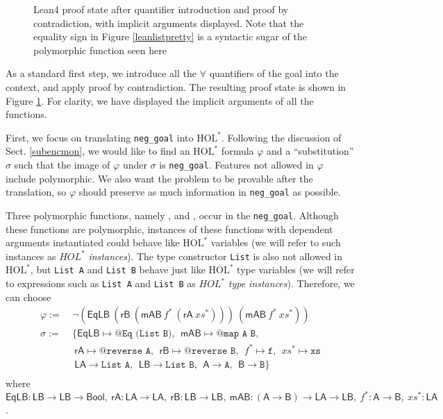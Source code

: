 \begin{figure}
  \begin{CenteredBox}
    
  \end{CenteredBox}
  \caption{Lean4 proof state after quantifier introduction and proof by contradiction, with implicit arguments displayed.
    Note that the equality sign in Figure \ref{leanlistpretty} is a syntactic sugar of
    the polymorphic function {\usebox{\vEq}} seen here}
  \label{leanlistexplicit}
\end{figure}

As a standard first step, we introduce all the $\forall$ quantifiers
of the goal into the context, and apply proof by contradiction. The resulting proof state
is shown in Figure \ref{leanlistexplicit}.
For clarity, we have displayed the implicit arguments of all the functions.

First, we focus on translating \texttt{neg\_goal} into $\text{HOL}^*$. Following the
discussion of Sect. \ref{subencmon}, we would like to find an $\text{HOL}^*$ formula $\varphi$
and a ``substitution'' $\sigma$ such that the image of $\varphi$ under $\sigma$ is \texttt{neg\_goal}.
Features not allowed in $\varphi$ include polymorphic. We also want the problem to
be provable after the translation, so $\varphi$ should preserve as much information in
\texttt{neg\_goal} as possible.

Three polymorphic functions, namely \usebox{\vEq}, \usebox{\vmap} and \usebox{\vrev}, occur in the \texttt{neg\_goal}.
Although these functions are polymorphic, instances of these functions
with dependent arguments instantiated could behave like $\text{HOL}^*$ variables
(we will refer to such instances as $\mathit{HOL}^*$ \textit{instances}).
The type constructor \texttt{List} is also not allowed in $\text{HOL}^*$, but
\texttt{List A} and \texttt{List B} behave just like $\text{HOL}^*$ type variables
(we will refer to expressions such as \texttt{List A} and \texttt{List B} as $\mathit{HOL}^*$ \textit{type instances}).
Therefore, we can choose
$$\begin{aligned}
  \varphi := & \ \neg (\mathsf{EqLB} \ (\mathsf{rB} \ (\mathsf{mAB} \ f^* \ (\mathsf{rA} \ \mathit{xs}^*))) \ (\mathsf{mAB} \ f^* \ \mathit{xs}^*)) \\
  \sigma := & \ \{\mathsf{EqLB} \mapsto \texttt{@Eq (List B)}, \ \ \mathsf{mAB} \mapsto \texttt{@map A B}, \\
            & \ \ \mathsf{rA} \mapsto \texttt{@reverse A}, \ \ \mathsf{rB} \mapsto \texttt{@reverse B}, \ \ f^* \mapsto \texttt{f}, \ \ \mathit{xs}^* \mapsto \texttt{xs} \\
            & \ \ \mathsf{LA} \to \texttt{List A}, \ \ \mathsf{LB} \to \texttt{List B}, \ \ \mathsf{A} \to \texttt{A}, \ \ \mathsf{B} \to \texttt{B}\} \\
\end{aligned}$$
where $\mathsf{EqLB} : \mathsf{LB} \to \mathsf{LB} \to \mathsf{Bool}, \
\mathsf{rA} : \mathsf{LA} \to \mathsf{LA}, \ \mathsf{rB} : \mathsf{LB} \to \mathsf{LB}, \ 
\mathsf{mAB} : (\mathsf{A} \to \mathsf{B}) \to \mathsf{LA} \to \mathsf{LB}, \
f^* : \mathsf{A} \to \mathsf{B}, \ \mathit{xs}^* : \mathsf{LA}$.

